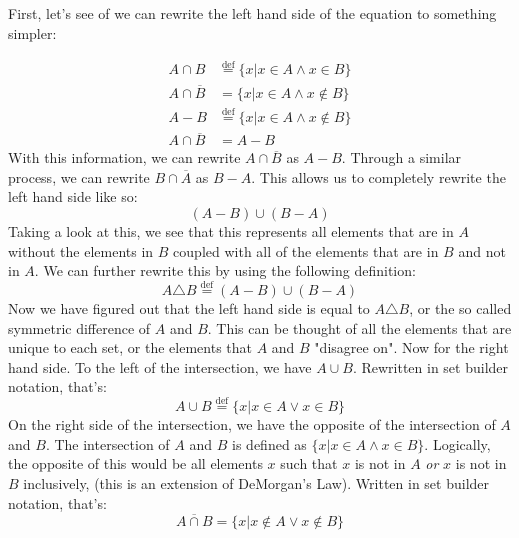 \documentclass[12pt]{exam}
\begin{document}
\begin{questions}
{\begin{minipage}[t]{14.55cm}
			First, let's see of we can rewrite the left hand side of the equation to something simpler:
			\begin{center}
				\begin{align*}
					A \cap B &\stackrel{\text{def}}{=} \{x | x \in A \wedge x \in B\} \\
					A \cap \overline{B} &= \{x | x \in A \wedge x \not\in B\} \\
					A - B &\stackrel{\text{def}}{=} \{x | x \in A \wedge x \not\in B\} \\
					A \cap \overline{B} &= A - B
				\end{align*}
				With this information, we can rewrite $A \cap \overline{B}$ as $A - B$. Through a similar process, we can rewrite $B \cap \overline{A}$ as $B - A$. This allows us to completely rewrite the left hand side like so:
				$$(A - B) \cup (B - A)$$
				Taking a look at this, we see that this represents all elements that are in $A$ without the elements in $B$ coupled with all of the elements that are in $B$ and not in $A$. We can further rewrite this by using the following definition:
				$$A \triangle B \stackrel{\text{def}}{=} (A - B) \cup (B - A)$$
				Now we have figured out that the left hand side is equal to $A \triangle B$, or the so called symmetric difference of $A$ and $B$. This can be thought of all the elements that are unique to each set, or the elements that $A$ and $B$ "disagree on".
				\newline
				\newline
				Now for the right hand side. To the left of the intersection, we have $A \cup B$. Rewritten in set builder notation, that's:
				$$A \cup B \stackrel{\text{def}}{=} \{x | x \in A \vee x \in B\}$$
				On the right side of the intersection, we have the opposite of the intersection of $A$ and $B$. The intersection of $A$ and $B$ is defined as $\{x | x \in A \wedge x \in B\}$. Logically, the opposite of this would be all elements $x$ such that $x$ is not in $A$ \textit{or} $x$ is not in $B$ inclusively, (this is an extension of DeMorgan's Law). Written in set builder notation, that's:
				$$\overline{A \cap B} = \{x | x \not\in A \vee x \not\in B\}$$
			\end{center}
			
			\vspace{25pt}
			\end{minipage}
		}
		
\clearpage

\fbox{
	\begin{minipage}[t]{14.55cm} \color{red}
		\vspace{25pt}
			

\end{minipage}}
\end{questions}
\end{document}
